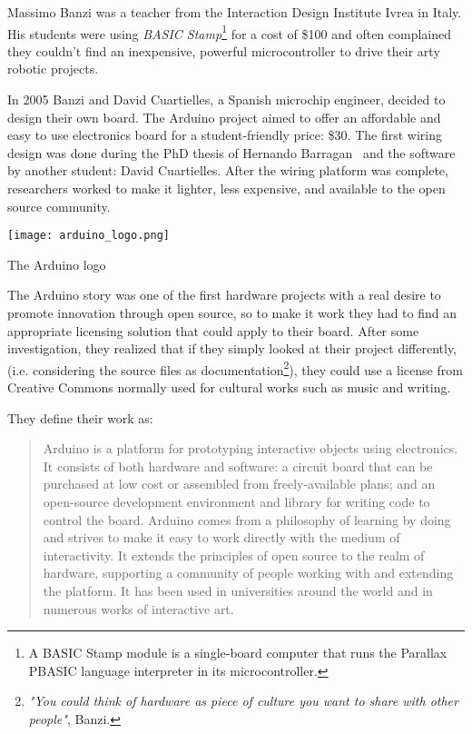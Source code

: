 Massimo Banzi was a teacher from the Interaction Design Institute Ivrea in Italy. His students were using \emph{BASIC Stamp}\footnote{A BASIC Stamp module is a single-board computer that runs the Parallax PBASIC language interpreter in its microcontroller.} for a cost of \$100 and often complained they couldn't find an inexpensive, powerful microcontroller to drive their arty robotic projects.

\begin{row}{4}{2}
    \begin{cell}{3}
      In 2005 Banzi and David Cuartielles, a Spanish microchip engineer, decided to design their own board. The Arduino project aimed to offer an affordable and easy to use electronics board for a student-friendly price: \$30. The first wiring design was done during the PhD thesis of Hernando Barragan~\parencite{barragan2004wiring} and the software by another student: David Cuartielles.
      After the wiring platform was complete, researchers worked to make it lighter, less expensive, and available to the open source community.
    \end{cell}
    \begin{cell}{1}
        \begin{NFfigure}
            \centering
                \texttt{[image: arduino\_logo.png]}
            \caption{The Arduino logo}
            \label{fig:arduino_logo}
        \end{NFfigure}
    \end{cell}
\end{row}

The Arduino story was one of the first hardware projects with a real desire to promote innovation through open source, so to make it work they had to find an appropriate licensing solution that could apply to their board. After some investigation, they realized that if they simply looked at their project differently, (i.e. considering the source files as documentation\footnote{\emph{"You could think of hardware as piece of culture you want to share with other people"}, Banzi. }), they could use a license from Creative Commons normally used for cultural works such as music and writing.

They define their work as:

\begin{quotation}
  Arduino is a platform for prototyping interactive objects using electronics. It consists of both hardware and software: a circuit board that can be purchased at low cost or assembled from freely-available plans; and an open-source development environment and library for writing code to control the board. Arduino comes from a philosophy of learning by doing and strives to make it easy to work directly with the medium of interactivity. It extends the principles of open source to the realm of hardware, supporting a community of people working with and extending the platform. It has been used in universities around the world and in numerous works of interactive art.

\end{quotation}


